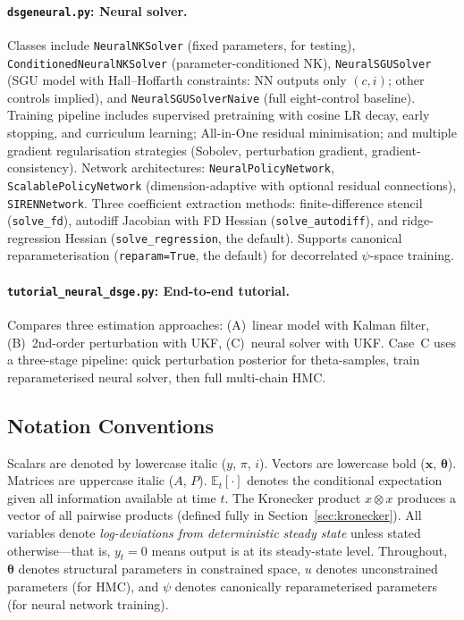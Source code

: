 \documentclass[11pt,a4paper]{article}
\theoremstyle{definition}
\newcommand{\E}{\mathbb{E}}
\newcommand{\btheta}{\boldsymbol{\theta}}
\newcommand{\bx}{\mathbf{x}}
\newcommand{\code}[1]{\texttt{\color{codecolor}#1}}
\begin{document}
	\paragraph{\code{dsgeneural.py}: Neural solver.}
	Classes include \code{NeuralNKSolver} (fixed parameters, for testing), \code{ConditionedNeuralNKSolver} (parameter-conditioned NK), \code{NeuralSGUSolver} (SGU model with Hall--Hoffarth constraints: NN outputs only $(c,i)$; other controls implied), and \code{NeuralSGUSolverNaive} (full eight-control baseline).
	Training pipeline includes supervised pretraining with cosine LR decay, early stopping, and curriculum learning; All-in-One residual minimisation; and multiple gradient regularisation strategies (Sobolev, perturbation gradient, gradient-consistency).
	Network architectures: \code{NeuralPolicyNetwork}, \code{ScalablePolicyNetwork} (dimension-adaptive with optional residual connections), \code{SIRENNetwork}.
	Three coefficient extraction methods: finite-difference stencil (\code{solve\_fd}), autodiff Jacobian with FD Hessian (\code{solve\_autodiff}), and ridge-regression Hessian (\code{solve\_regression}, the default).
	Supports canonical reparameterisation (\code{reparam=True}, the default) for decorrelated $\psi$-space training.
	
	\paragraph{\code{tutorial\_neural\_dsge.py}: End-to-end tutorial.}
	Compares three estimation approaches: (A)~linear model with Kalman filter, (B)~2nd-order perturbation with UKF, (C)~neural solver with UKF.
	Case~C uses a three-stage pipeline: quick perturbation posterior for theta-samples, train reparameterised neural solver, then full multi-chain HMC.
	
	\subsection{Notation Conventions}
	
	Scalars are denoted by lowercase italic ($y$, $\pi$, $i$).
	Vectors are lowercase bold ($\bx$, $\btheta$).
	Matrices are uppercase italic ($A$, $P$).
	$\E_t[\cdot]$ denotes the conditional expectation given all information available at time $t$.
	The Kronecker product $x \otimes x$ produces a vector of all pairwise products (defined fully in Section~\ref{sec:kronecker}).
	All variables denote \emph{log-deviations from deterministic steady state} unless stated otherwise---that is, $y_t = 0$ means output is at its steady-state level.
	Throughout, $\btheta$ denotes structural parameters in constrained space, $u$ denotes unconstrained parameters (for HMC), and $\psi$ denotes canonically reparameterised parameters (for neural network training).
	
\end{document}
